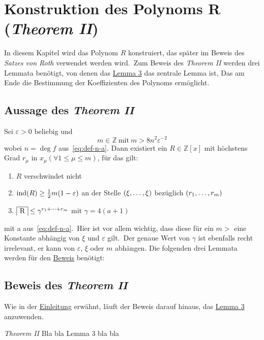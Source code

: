 
\section{Konstruktion des Polynoms R (\emph{Theorem II})}
    \label{sec:th2}
    \textrm{In diesem Kapitel wird das Polynom $R$ konstruiert, das später im Beweis des \emph{Satzes von Roth}
    verwendet werden wird.\ Zum Beweis des \emph{Theorem II} werden drei Lemmata benötigt, von denen das \hyperref
    [subsec:lemma3]{Lemma 3} das zentrale Lemma ist, Das am Ende die Bestimmung der Koeffizienten des Polynoms
    ermöglicht.}
    
    \subsection{Aussage des \emph{Theorem II}}
        \label{subsec:th2}
        Sei $\varepsilon > 0$ beliebig und
        \begin{equation}
            m \in \mathbb{Z} \  \text{mit} \  m > 8 n^2 \varepsilon^{-2} \label{eq:def-m}
        \end{equation}
        wobei $n = \deg f$ aus~\eqref{eq:def-n-a}.
        \textrm{Dann existiert ein $R \in \mathbb{Z}[x]$ mit höchstens Grad $r_\mu$ in $x_\mu (\forall 1 \leq \mu
        \leq m)$, für das gilt:}
        \begin{enumerate}
            \item $R$ verschwindet nicht
            \item \textrm{$\operatorname{ind}(R) \geq \frac{1}{2} m (1 - \varepsilon)$ an der Stelle $(\xi, \dots, \xi)$ bezüglich
                $(r_1, \dots, r_m)$}
            \item $\content{R} \leq \gamma^{\dsum{r_1}{r_m}}$ mit $\gamma = 4 (a + 1)$
        \end{enumerate}
        \textrm{mit a aus~\eqref{eq:def-n-a}.\ Hier ist vor allem wichtig, dass diese für ein $m >$ eine Konstante
        abhängig von $\xi$ und $\varepsilon$ gilt.\ Der genaue Wert von $\gamma$ ist ebenfalls recht irrelevant, er
        kann von $\varepsilon$, $\xi$ oder $m$ abhängen.}
        \newline \newline
        \textrm{Die folgenden drei Lemmata werden für den \hyperref[subsec:proof-th2]{Beweis} benötigt:}
    
    
    
    \subsection{Beweis des \emph{Theorem II}}
        \label{subsec:proof-th2}
        \textrm{Wie in der \hyperref[sec:th2]{Einleitung} erwähnt, läuft der Beweis darauf hinaus, das \hyperref
        [subsec:lemma3]{Lemma 3} anzuwenden.}
        \begin{proofname}{\emph{Theorem II}}
            Bla bla Lemma 3 bla bla
        \end{proofname}
    
